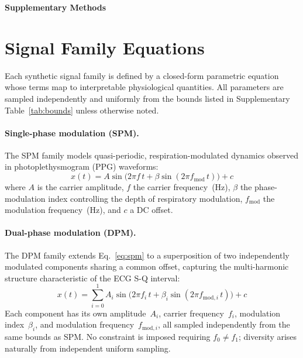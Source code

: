 \documentclass[11pt]{article}
\begin{document}
\begin{center}
    {\LARGE\bfseries Supplementary Methods}
\end{center}

\vspace{1em}

\section{Signal Family Equations}
\label{sec:equations}

Each synthetic signal family is defined by a closed-form parametric equation whose terms map to interpretable physiological quantities. All parameters are sampled independently and uniformly from the bounds listed in Supplementary Table~\ref{tab:bounds} unless otherwise noted.

\paragraph{Single-phase modulation (SPM).}
The SPM family models quasi-periodic, respiration-modulated dynamics observed in photoplethysmogram (PPG) waveforms:
\begin{equation}
    x(t) = A \sin\!\bigl(2\pi f\, t + \beta \sin(2\pi f_{\mathrm{mod}}\, t)\bigr) + c
    \label{eq:spm}
\end{equation}
where $A$ is the carrier amplitude, $f$ the carrier frequency~(Hz), $\beta$ the phase-modulation index controlling the depth of respiratory modulation, $f_{\mathrm{mod}}$ the modulation frequency~(Hz), and $c$ a DC offset.

\paragraph{Dual-phase modulation (DPM).}
The DPM family extends Eq.~\eqref{eq:spm} to a superposition of two independently modulated components sharing a common offset, capturing the multi-harmonic structure characteristic of the ECG S-Q interval:
\begin{equation}
    x(t) = \sum_{i=0}^{1} A_i \sin\!\bigl(2\pi f_i\, t + \beta_i \sin(2\pi f_{\mathrm{mod},i}\, t)\bigr) + c
    \label{eq:dpm}
\end{equation}
Each component has its own amplitude~$A_i$, carrier frequency~$f_i$, modulation index~$\beta_i$, and modulation frequency~$f_{\mathrm{mod},i}$, all sampled independently from the same bounds as SPM. No constraint is imposed requiring $f_0 \neq f_1$; diversity arises naturally from independent uniform sampling.
\end{document}
